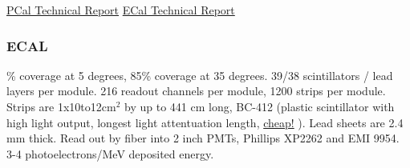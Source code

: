 \href{https://www.sciencedirect.com/science/article/pii/S0168900220300309?via\%3Dihub}{PCal Technical Report}
\href{https://www.sciencedirect.com/science/article/pii/S0168900200009967}{ECal Technical Report}

                
        \subsubsection{ECAL}
                \% coverage at 5 degrees, 85\% coverage at 35 degrees. 39/38 scintillators / lead layers per module. 216 readout channels per module, 1200 strips per module. Strips are 1x10to12cm$^2$ by up to 441 cm long, BC-412 (plastic scintillator with high light output, longest light attentuation length, \href{https://www.crystals.saint-gobain.com/products/bc-408-bc-412-bc-416}{cheap!} ). Lead sheets are 2.4 mm thick. Read out by fiber into 2 inch PMTs, Phillips XP2262 and EMI 9954. 3-4 photoelectrons/MeV deposited energy. 
\fi